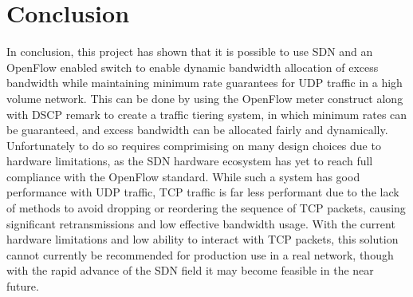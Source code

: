 \documentclass[accepted,single]{gipaper}
\begin{document}
\section{Conclusion}
\label{conclusion}

In conclusion, this project has shown that it is possible to use SDN and an OpenFlow enabled switch to enable dynamic bandwidth allocation of excess bandwidth while maintaining minimum rate guarantees for UDP traffic in a high volume network. This can be done by using the OpenFlow meter construct along with DSCP remark to create a traffic tiering system, in which minimum rates can be guaranteed, and excess bandwidth can be allocated fairly and dynamically. Unfortunately to do so requires comprimising on many design choices due to hardware limitations, as the SDN hardware ecosystem has yet to reach full compliance with the OpenFlow standard. While such a system has good performance with UDP traffic, TCP traffic is far less performant due to the lack of methods to avoid dropping or reordering the sequence of TCP packets, causing significant retransmissions and low effective bandwidth usage. With the current hardware limitations and low ability to interact with TCP packets, this solution cannot currently be recommended for production use in a real network, though with the rapid advance of the SDN field it may become feasible in the near future.


\end{document}
